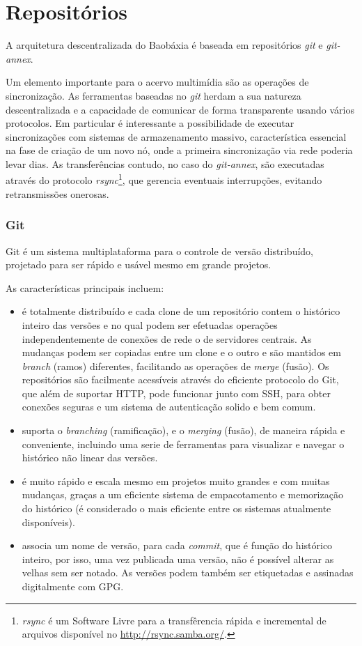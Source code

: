 \chapter{Repositórios}\label{Repositórios}\lhead{\leftmark}

A arquitetura descentralizada do Baobáxia é baseada em repositórios
\emph{git} e \emph{git-annex}.

Um elemento importante para o acervo multimídia são as operações de
sincronização. As ferramentas baseadas no \emph{git} herdam a sua
natureza descentralizada e a capacidade de comunicar de forma
transparente usando vários protocolos. Em particular é interessante a
possibilidade de executar sincronizações com sistemas de armazenamento
massivo, característica essencial na fase de criação de um novo nó,
onde a primeira sincronização via rede poderia levar dias. As
transferências contudo, no caso do \emph{git-annex}, são executadas
através do protocolo \emph{rsync}\footnote{\emph{rsync} é um Software
  Livre para a transfêrencia rápida e incremental de arquivos
  disponível no \url{http://rsync.samba.org/}.}, que gerencia
eventuais interrupções, evitando retransmissões onerosas.


\subsection{Git}\label{sec:GIT}
Git é um sistema multiplataforma para o controle de versão
distribuído, projetado para ser rápido e usável mesmo em grande
projetos.

As características principais incluem:
\begin{itemize}
\item é totalmente distribuído e cada clone de um repositório contem o
  histórico inteiro das versões e no qual podem ser efetuadas
  operações independentemente de conexões de rede o de servidores
  centrais. As mudanças podem ser copiadas entre um clone e o outro e
  são mantidos em \emph{branch} (ramos) diferentes, facilitando as
  operações de \emph{merge} (fusão). Os repositórios são facilmente
  acessíveis através do eficiente protocolo do Git, que além de
  suportar HTTP, pode funcionar junto com SSH, para obter conexões
  seguras e um sistema de autenticação solido e bem comum.
\item suporta o \emph{branching} (ramificação), e o \emph{merging}
  (fusão), de maneira rápida e conveniente, incluindo uma serie de
  ferramentas para visualizar e navegar o histórico não linear das
  versões.
\item é muito rápido e escala mesmo em projetos muito grandes e com
  muitas mudanças, graças a um eficiente sistema de empacotamento e
  memorização do histórico (é considerado o mais eficiente entre os
  sistemas atualmente disponíveis).
\item associa um nome de versão, para cada \emph{commit}, que é função
  do histórico inteiro, por isso, uma vez publicada uma versão, não é
  possível alterar as velhas sem ser notado. As versões podem também
  ser etiquetadas e assinadas digitalmente com GPG.
\end{itemize}

